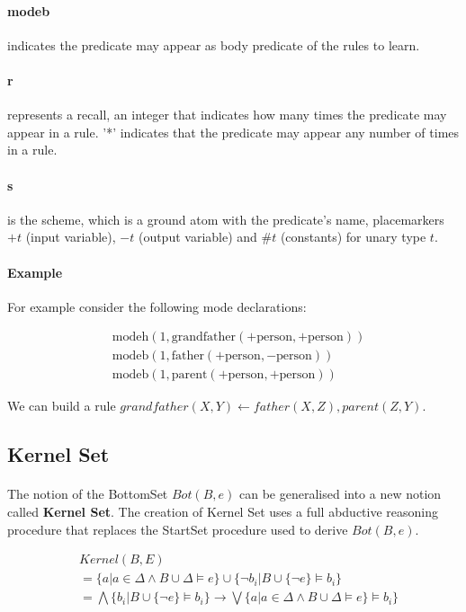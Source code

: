 \documentclass{article}
\theoremstyle{plain}
\theoremstyle{definition}
\begin{document}
\begin{multicols}{2}
\paragraph{modeb} indicates the predicate may appear as body predicate of the rules to learn.
\paragraph{r} represents a recall, an integer that indicates how many times the predicate may appear in a rule. '*' indicates that the predicate may appear any number of times in a rule.
\paragraph{s} is the scheme, which is a ground atom with the predicate's name, placemarkers $+t$ (input variable), $-t$ (output variable) and $\#t$ (constants) for unary type $t$. 

\paragraph{Example} For example consider the following mode declarations:

\begin{align*}
	&\text{modeh}(1, \text{grandfather}(+\text{person}, +\text{person}))\\
	&\text{modeb}(1, \text{father}(+\text{person}, -\text{person}))\\
	&\text{modeb}(1, \text{parent}(+\text{person}, +\text{person}))
\end{align*}

We can build a rule $grandfather(X, Y) \leftarrow father(X, Z), parent(Z, Y)$.

\subsection{Kernel Set}

\paragraph{} The notion of the BottomSet $Bot(B, e)$ can be generalised into a new notion called \textbf{Kernel Set}. The creation of Kernel Set uses a full abductive reasoning procedure that replaces the StartSet procedure used to derive $Bot(B, e)$. 

{\footnotesize
\begin{align*}
& Kernel(B, E) \\
&= \{a | a \in \Delta \land B \cup \Delta \models e\} \cup \{\lnot b_i | B \cup \{\lnot e\} \models b_i\} \\
&= \bigwedge \{b_i | B \cup \{\lnot e\} \models b_i\} \rightarrow \bigvee \{a | a \in \Delta \land B \cup \Delta \models e\} \models b_i\}
\end{align*}}


\end{multicols}
\end{document}
